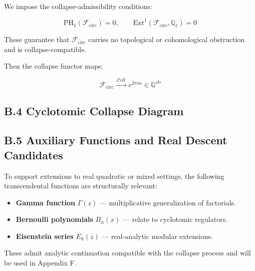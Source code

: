 \documentclass[11pt]{article}
\begin{document}
We impose the collapse-admissibility conditions:

\[
\mathrm{PH}_1(\mathcal{F}_{\mathrm{circ}}) = 0, \qquad \mathrm{Ext}^1(\mathcal{F}_{\mathrm{circ}}, \mathbb{Q}_\ell) = 0
\]

These guarantee that \( \mathcal{F}_{\mathrm{circ}} \) carries no topological or cohomological obstruction and is collapse-compatible.

Then the collapse functor maps:

\[
\mathcal{F}_{\mathrm{circ}} \xrightarrow{\ \mathcal{C}oll\ } e^{2\pi i \alpha} \in \mathbb{Q}^{\mathrm{ab}}
\]

\subsection*{B.4 Cyclotomic Collapse Diagram}

\begin{center}
\end{center}

\subsection*{B.5 Auxiliary Functions and Real Descent Candidates}

To support extensions to real quadratic or mixed settings, the following transcendental functions are structurally relevant:

\begin{itemize}
    \item \textbf{Gamma function} \( \Gamma(z) \) — multiplicative generalization of factorials.
    \item \textbf{Bernoulli polynomials} \( B_n(x) \) — relate to cyclotomic regulators.
    \item \textbf{Eisenstein series} \( E_k(z) \) — real-analytic modular extensions.
\end{itemize}

These admit analytic continuation compatible with the collapse process and will be used in Appendix F.
\end{document}
